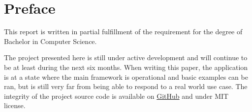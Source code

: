 \chapter{Preface}
This report is written in partial fulfillment of the requirement 
for the degree of Bachelor in Computer Science. 

The project presented here is still under active development and 
will continue to be at least during the next six months. When writing 
this paper, the application is at a state where the main framework 
is operational and basic examples can be ran, but is still very far 
from being able to respond to a real world use case. The integrity 
of the project source code is available on 
\href{https://github.com/tuvistavie/scala-x-server}{GitHub} 
and under MIT license.

